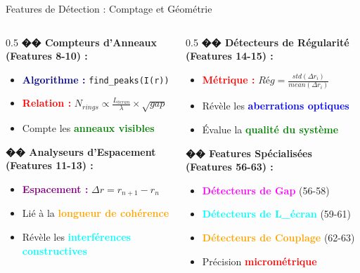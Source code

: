 \documentclass[aspectratio=169]{beamer}
\begin{document}
\begin{frame}{Features de Détection : Comptage et Géométrie}
    \begin{columns}
        \begin{column}{0.5\textwidth}
            \textbf{�� Compteurs d'Anneaux (Features 8-10) :}
            \begin{itemize}
                \item \textcolor{darkblue}{\textbf{Algorithme :}} \texttt{find\_peaks(I(r))}
                \item \textcolor{red}{\textbf{Relation :}} $N_{rings} \propto \frac{L_{écran}}{\lambda} \times \sqrt{gap}$
                \item Compte les \textcolor{green}{\textbf{anneaux visibles}}
            \end{itemize}

            \vspace{0.3cm}
            \textbf{�� Analyseurs d'Espacement (Features 11-13) :}
            \begin{itemize}
                \item \textcolor{purple}{\textbf{Espacement :}} $\Delta r = r_{n+1} - r_n$
                \item Lié à la \textcolor{orange}{\textbf{longueur de cohérence}}
                \item Révèle les \textcolor{cyan}{\textbf{interférences constructives}}
            \end{itemize}
        \end{column}
        \begin{column}{0.5\textwidth}
            \textbf{�� Détecteurs de Régularité (Features 14-15) :}
            \begin{itemize}
                \item \textcolor{red}{\textbf{Métrique :}} $Rég = \frac{std(\Delta r_i)}{mean(\Delta r_i)}$
                \item Révèle les \textcolor{blue}{\textbf{aberrations optiques}}
                \item Évalue la \textcolor{green}{\textbf{qualité du système}}
            \end{itemize}

            \vspace{0.3cm}
            \textbf{�� Features Spécialisées (Features 56-63) :}
            \begin{itemize}
                \item \textcolor{magenta}{\textbf{Détecteurs de Gap}} (56-58)
                \item \textcolor{cyan}{\textbf{Détecteurs de L\_écran}} (59-61)
                \item \textcolor{orange}{\textbf{Détecteurs de Couplage}} (62-63)
                \item Précision \textcolor{red}{\textbf{micrométrique}}
            \end{itemize}
        \end{column}
    \end{columns}
\end{frame}
\end{document}
